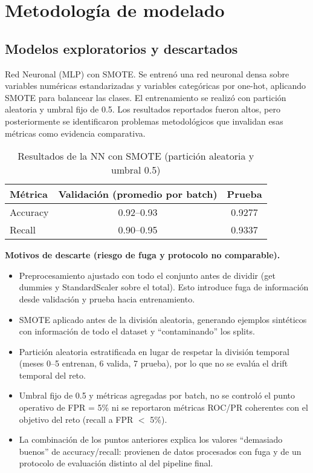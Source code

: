 \documentclass[runningheads]{llncs}
\begin{document}
\section{Metodología de modelado}

\subsection{Modelos exploratorios y descartados}

Red Neuronal (MLP) con SMOTE.
Se entrenó una red neuronal densa sobre variables numéricas estandarizadas y variables categóricas por one-hot, aplicando SMOTE para balancear las clases. El entrenamiento se realizó con partición aleatoria y umbral fijo de 0.5. Los resultados reportados fueron altos, pero posteriormente se identificaron problemas metodológicos que invalidan esas métricas como evidencia comparativa.

\begin{table}[H]
\centering
\caption{Resultados de la NN con SMOTE (partición aleatoria y umbral 0.5)}
\begin{tabular}{lcc}
\toprule
Métrica & Validación (promedio por batch) & Prueba \\
\midrule
Accuracy & 0.92--0.93 & 0.9277 \\
Recall   & 0.90--0.95 & 0.9337 \\
\bottomrule
\end{tabular}
\end{table}

\textbf{Motivos de descarte (riesgo de fuga y protocolo no comparable).}
\begin{itemize}
  \item Preprocesamiento ajustado con todo el conjunto antes de dividir (get dummies y StandardScaler sobre el total). Esto introduce fuga de información desde validación y prueba hacia entrenamiento.
  \item SMOTE aplicado antes de la división aleatoria, generando ejemplos sintéticos con información de todo el dataset y “contaminando” los splits.
  \item Partición aleatoria estratificada en lugar de respetar la división temporal (meses 0–5 entrenan, 6 valida, 7 prueba), por lo que no se evalúa el drift temporal del reto.
  \item Umbral fijo de 0.5 y métricas agregadas por batch, no se controló el punto operativo de FPR = 5\% ni se reportaron métricas ROC/PR coherentes con el objetivo del reto (recall a FPR $<$ 5\%).
  \item La combinación de los puntos anteriores explica los valores “demasiado buenos” de accuracy/recall: provienen de datos procesados con fuga y de un protocolo de evaluación distinto al del pipeline final.
\end{itemize}
\end{document}
